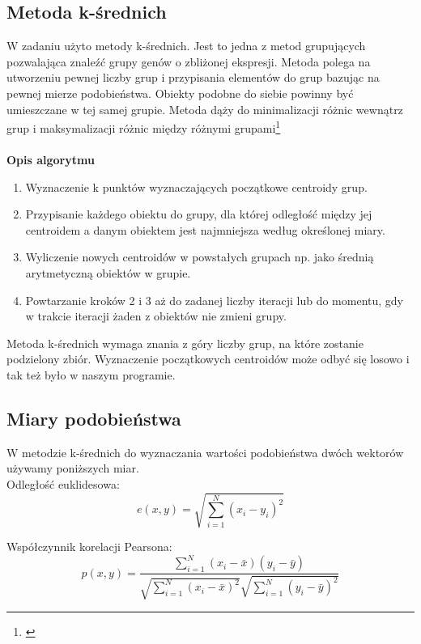 \documentclass{classrep}
\begin{document}
\subsection{Metoda k-średnich}
W zadaniu użyto metody k-średnich. Jest to jedna z metod grupujących pozwalająca znaleźć grupy genów o zbliżonej ekspresji. Metoda polega na utworzeniu pewnej liczby grup i przypisania elementów do grup bazując na pewnej mierze podobieństwa. Obiekty podobne do siebie powinny być umieszczane w tej samej grupie. Metoda dąży do minimalizacji różnic wewnątrz grup i maksymalizacji różnic między różnymi grupami\footnote{\cite{metodyklasyfikacji}}\\\\
\textbf{Opis algorytmu}
\begin{enumerate}

\item Wyznaczenie k punktów wyznaczających początkowe centroidy grup.

\item Przypisanie każdego obiektu do grupy, dla której odległość między jej centroidem a danym obiektem jest najmniejsza według określonej miary.

\item Wyliczenie nowych centroidów w powstałych grupach np. jako średnią arytmetyczną obiektów w grupie.

\item Powtarzanie kroków 2 i 3 aż do zadanej liczby iteracji lub do momentu, gdy w trakcie iteracji żaden z obiektów nie zmieni grupy.\\
\end{enumerate}
Metoda k-średnich wymaga znania z góry liczby grup, na które zostanie podzielony zbiór. Wyznaczenie początkowych centroidów może odbyć się losowo i tak też było w naszym programie.
\subsection{Miary podobieństwa}
W metodzie k-średnich do wyznaczania wartości podobieństwa dwóch wektorów używamy poniższych miar.\\

Odległość euklidesowa:
\begin{equation}
  e(x, y) = \sqrt{\displaystyle \sum_{i = 1}^{N} (x_i - y_i)^2}
\end{equation}

Współczynnik korelacji Pearsona:
\begin{equation}
  p(x,y) = \frac{\displaystyle\sum_{i = 1}^{N}(x_i - \bar{x})(y_i -
\bar{y})}{\sqrt{\displaystyle \sum_{i=1}^N (x_i - \bar{x})^2}\sqrt{\displaystyle
\sum_{i=1}^N (y_i - \bar{y})^2}}
\end{equation}
\end{document}
